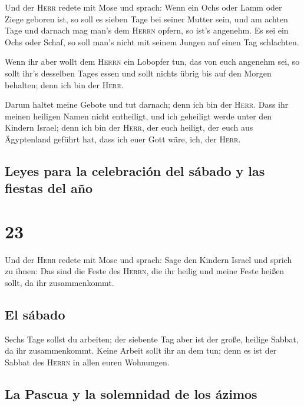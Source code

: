  Und der \textsc{Herr} redete mit Mose und sprach:
 Wenn ein Ochs oder Lamm oder Ziege geboren ist, so soll
es sieben Tage bei seiner Mutter sein, und am achten Tage und darnach
mag man's dem \textsc{Herrn} opfern, so ist's angenehm. 
Es sei ein Ochs oder Schaf, so soll man's nicht mit seinem Jungen auf
einen Tag schlachten.

 Wenn ihr aber wollt dem \textsc{Herrn} ein Lobopfer tun,
das von euch angenehm sei,  so sollt ihr's desselben
Tages essen und sollt nichts übrig bis auf den Morgen behalten; denn ich
bin der \textsc{Herr}.

 Darum haltet meine Gebote und tut darnach; denn ich bin
der \textsc{Herr}.  Dass ihr meinen heiligen Namen nicht
entheiligt, und ich geheiligt werde unter den Kindern Israel; denn ich
bin der \textsc{Herr}, der euch heiligt,  der euch aus
Ägyptenland geführt hat, dass ich euer Gott wäre, ich, der
\textsc{Herr}.

\hypertarget{leyes-para-la-celebraciuxf3n-del-suxe1bado-y-las-fiestas-del-auxf1o}{%
\subsection{Leyes para la celebración del sábado y las fiestas del
año}\label{leyes-para-la-celebraciuxf3n-del-suxe1bado-y-las-fiestas-del-auxf1o}}

\hypertarget{section-22}{%
\section{23}\label{section-22}}

 Und der \textsc{Herr} redete mit Mose und sprach:
 Sage den Kindern Israel und sprich zu ihnen: Das sind die
Feste des \textsc{Herrn}, die ihr heilig und meine Feste heißen sollt,
da ihr zusammenkommt.

\hypertarget{el-suxe1bado}{%
\subsection{El sábado}\label{el-suxe1bado}}

 Sechs Tage sollst du arbeiten; der siebente Tag aber ist
der große, heilige Sabbat, da ihr zusammenkommt. Keine Arbeit sollt ihr
an dem tun; denn es ist der Sabbat des \textsc{Herrn} in allen euren
Wohnungen.

\hypertarget{la-pascua-y-la-solemnidad-de-los-uxe1zimos}{%
\subsection{La Pascua y la solemnidad de los
ázimos}\label{la-pascua-y-la-solemnidad-de-los-uxe1zimos}}

